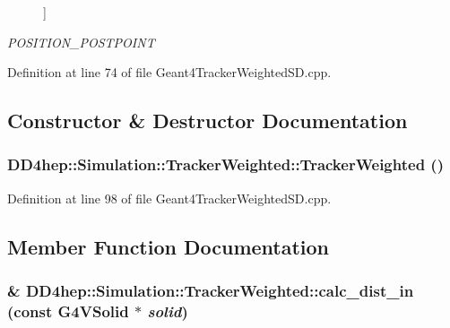 \begin{Desc}
\begin{description}
{}]\item[{\em 
\hypertarget{struct_d_d4hep_1_1_simulation_1_1_tracker_weighted_a8cdc474134c1f8b3a8344e32fc3d4421ac0ca75f525d337568debb34bf3545e29}{
POSITION\_\-POSTPOINT}
\label{struct_d_d4hep_1_1_simulation_1_1_tracker_weighted_a8cdc474134c1f8b3a8344e32fc3d4421ac0ca75f525d337568debb34bf3545e29}
}]\end{description}
\end{Desc}



Definition at line 74 of file Geant4TrackerWeightedSD.cpp.

\subsection{Constructor \& Destructor Documentation}
\hypertarget{struct_d_d4hep_1_1_simulation_1_1_tracker_weighted_ae628c5cfae79d839a0640338ba31a6ad}{
\subsubsection[{TrackerWeighted}]{\setlength{\rightskip}{0pt plus 5cm}DD4hep::Simulation::TrackerWeighted::TrackerWeighted ()}}
\label{struct_d_d4hep_1_1_simulation_1_1_tracker_weighted_ae628c5cfae79d839a0640338ba31a6ad}


Definition at line 98 of file Geant4TrackerWeightedSD.cpp.

\subsection{Member Function Documentation}
\hypertarget{struct_d_d4hep_1_1_simulation_1_1_tracker_weighted_aa9139da9ecb7c109b7108cc27a27c13d}{
\subsubsection[{calc\_\-dist\_\-in}]{\& DD4hep::Simulation::TrackerWeighted::calc\_\-dist\_\-in (const G4VSolid $\ast$ {\em solid})}}
\label{struct_d_d4hep_1_1_simulation_1_1_tracker_weighted_aa9139da9ecb7c109b7108cc27a27c13d}


